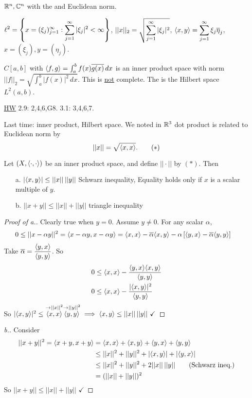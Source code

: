 \documentclass[]{article}
\begin{document}
\begin{example}
	$\mathbb{R}^n,\mathbb{C}^n$ with the  and Euclidean norm.
\end{example}
\newpage
\begin{example}
	$\displaystyle \ell^2 = \left\{ x = (\xi_j)_{j=1}^\infty : \sum_{j=1}^\infty |\xi_j|^2<\infty \right\}$, 
	$\displaystyle ||x||_2 = \sqrt{\sum_{j=1}^\infty |\xi_j|^2}$, 
	$\displaystyle \langle x,y \rangle = \sum_{j=1}^\infty \xi_j\overline{\eta}_j$,
	$x=(\xi_j),y=(\eta_j)$. %
\end{example}
\begin{example}
	$C[a,b]$ with $\langle f,g \rangle = \int_a^b f(x)\overline{g(x)}\,dx$ is an inner product space with  norm $||f||_2 = \sqrt{\int_a^b |f(x)|^2\,dx}$. This is \ul{not} complete.
	The  is the Hilbert space $L^2(a,b)$.
\end{example}
\ul{HW} 2.9: 2,4,6,G8. 3.1: 3,4,6,7.

Last time: inner product, Hilbert space. 
We  noted in $\mathbb{R}^3$ dot product is related to Euclidean norm by $$||x||=\sqrt{\langle x,x \rangle}. \qquad (*)$$

\begin{lemma}
	Let $(X,\langle \cdot,\cdot \rangle)$ be an inner product space, and define $||\cdot||$ by $(*)$.
	Then
	\begin{enumerate}
		\item[a.] $|\langle x,y \rangle|\leq||x||\,||y||$ Schwarz inequality,
			Equality holds only if $x$ is a scalar multiple of $y$.
		\item[b.] $||x+y||\leq||x||+||y||$ triangle inequality
	\end{enumerate}
\end{lemma}
\begin{proof}
	[Proof of a.]
	Clearly true when $y=0$. Assume $y\neq0$. For any scalar $\alpha$,
	\begin{align*}
		0 &\leq ||x-\alpha y||^2 = \langle x-\alpha y,x-\alpha y \rangle
		= \langle x,x \rangle-\overline{\alpha}\langle x,y \rangle-\alpha\left[\langle y,x \rangle-\overline{\alpha}\langle y,y \rangle\right]
	\end{align*}
	Take $\displaystyle\overline{\alpha} = \frac{\langle y,x \rangle}{\langle y,y \rangle}$.
	So 
	\begin{align*}
		0 &\leq \langle x,x \rangle - \frac{\langle y,x \rangle\langle x,y \rangle}{\langle y,y \rangle} \\
		0 &\leq \langle x,x \rangle - \frac{|\langle x,y \rangle|^2}{\langle y,y \rangle}
	\end{align*}
	So $
		|\langle x,y \rangle|^2 \leq \overset{\rightarrow||x||^2}{\langle x,x \rangle}\overset{\rightarrow||y||^2}{\langle y,y \rangle} \implies
		\langle x,y \rangle \leq ||x||\,||y|| \ \checkmark $
\end{proof}
\begin{proof}
	[b.] Consider 
	\begin{align*}
		||x+y||^2 = \langle x+y,x+y \rangle 
				  &= \langle x,x \rangle + \langle x,y \rangle + \langle y,x \rangle + \langle y,y \rangle \\ 
				  &\leq ||x||^2 + ||y||^2 + |\langle x,y \rangle| + |\langle y,x \rangle| \\
				  &\leq ||x||^2 + ||y||^2 + 2||x||\,||y|| \qquad (\text{Schwarz ineq.}) \\
				  &= (||x||+||y||)^2
	\end{align*}
	So $||x+y||\leq ||x||+||y||$ $\checkmark$
\end{proof}
\end{document}
